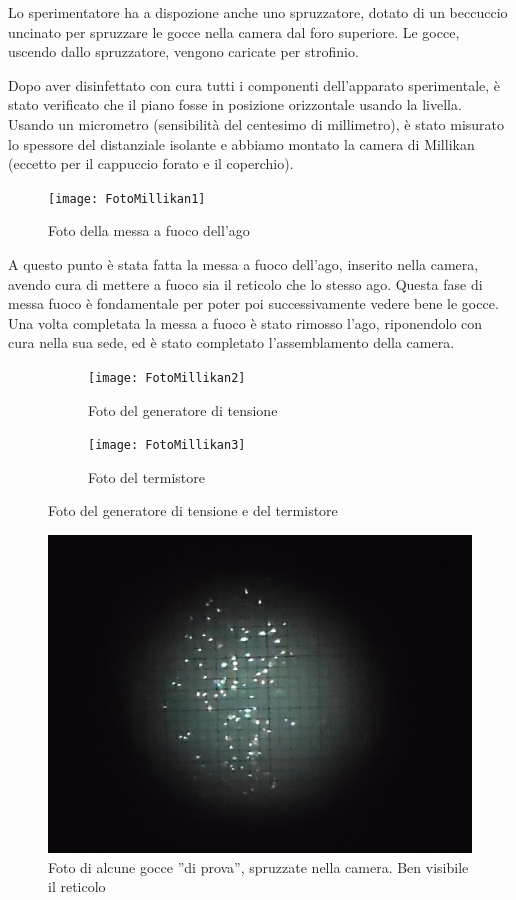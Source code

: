 \documentclass{article}
\begin{document}
\vspace{5mm}

Lo sperimentatore ha a dispozione anche uno spruzzatore, dotato di un beccuccio uncinato per spruzzare le gocce nella camera dal foro superiore. Le gocce, uscendo dallo spruzzatore, vengono caricate per strofinio.

\vspace{5mm}

Dopo aver disinfettato con cura tutti i componenti dell'apparato sperimentale, è stato verificato che il piano fosse in posizione orizzontale usando la livella. Usando un micrometro (sensibilità del centesimo di millimetro), è stato misurato lo spessore del distanziale isolante e abbiamo montato la camera di Millikan (eccetto per il cappuccio forato e il coperchio).

\begin{figure}[h]
\centering
\texttt{[image: FotoMillikan1]}
\caption{Foto della messa a fuoco dell'ago}
\end{figure}

A questo punto è stata fatta la messa a fuoco dell'ago, inserito nella camera, avendo cura di mettere a fuoco sia il reticolo che lo stesso ago. Questa fase di messa fuoco è fondamentale per poter poi successivamente vedere bene le gocce. Una volta completata la messa a fuoco è stato rimosso l'ago, riponendolo con cura nella sua sede, ed è stato completato l'assemblamento della camera.

\begin{figure}[h]
  \centering
  \begin{subfigure}[b]{0.4\linewidth}
    \texttt{[image: FotoMillikan2]}
    \caption{Foto del generatore di tensione}
  \end{subfigure}
  \begin{subfigure}[b]{0.4\linewidth}
    \texttt{[image: FotoMillikan3]}
    \caption{Foto del termistore}
  \end{subfigure}
  \caption{Foto del generatore di tensione e del termistore}
\end{figure}

\begin{figure}[h!]
\centering
\includegraphics[width=0.6\linewidth]{FotoMillikan4}
\caption{Foto di alcune gocce ''di prova'', spruzzate nella camera. Ben visibile il reticolo}
\end{figure}
\end{document}
